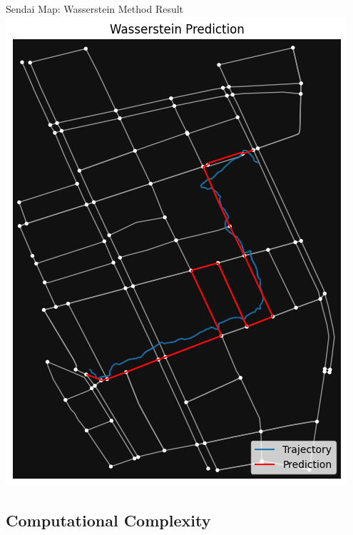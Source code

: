 \documentclass[aspectratio=169, bigfiles]{beamer}
\begin{document}
\begin{frame}{Sendai Map: Wasserstein Method Result}
\centering
\includegraphics[scale=0.21]{Jupyter Notebook LaTeX/wassersteinsendai.png}
    
\end{frame}

\subsection{Computational Complexity}
\end{document}

